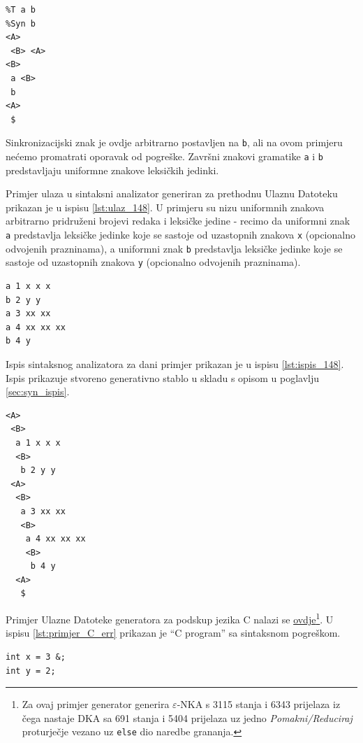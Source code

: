 \documentclass[times, 12pt, utf8]{book}
\begin{document}
\begin{lstlisting}[caption={Ulazna Datoteka za gramatiku sa 148.~stranice udžbenika.},label=lst:ulazna_datoteka_148]
%V <A> <B>
%T a b
%Syn b
<A>
 <B> <A>
<B>
 a <B>
 b
<A>
 $
\end{lstlisting}

Sinkronizacijski znak je ovdje arbitrarno postavljen na \verb|b|, ali na ovom primjeru nećemo promatrati oporavak od pogreške.
Završni znakovi gramatike \verb|a| i \verb|b| predstavljaju uniformne znakove leksičkih jedinki.

Primjer ulaza u sintaksni analizator generiran za prethodnu Ulaznu Datoteku prikazan je u ispisu \ref{lst:ulaz_148}.
U primjeru su nizu uniformnih znakova arbitrarno pridruženi brojevi redaka i leksičke jedine - recimo da uniformni znak \verb|a| predstavlja leksičke jedinke koje se sastoje od uzastopnih znakova \verb|x| (opcionalno odvojenih prazninama), a uniformni znak \verb|b| predstavlja leksičke jedinke koje se sastoje od uzastopnih znakova \verb|y| (opcionalno odvojenih prazninama).

\begin{lstlisting}[caption={Ulaz u analizator za gramatiku sa 148.~stranice udžbenika.},label=lst:ulaz_148]
a 1 x x x
b 2 y y
a 3 xx xx
a 4 xx xx xx
b 4 y
\end{lstlisting}

Ispis sintaksnog analizatora za dani primjer prikazan je u ispisu \ref{lst:ispis_148}.
Ispis prikazuje stvoreno generativno stablo u skladu s opisom u poglavlju \ref{sec:syn_ispis}.

\begin{lstlisting}[caption={Ispis analizatora za gramatiku sa 148.~stranice udžbenika i ulaz is ispisa \ref{lst:ulaz_148}.},label=lst:ispis_148]
<A>
 <B>
  a 1 x x x
  <B>
   b 2 y y
 <A>
  <B>
   a 3 xx xx
   <B>
    a 4 xx xx xx
    <B>
     b 4 y
  <A>
   $
\end{lstlisting}

Primjer Ulazne Datoteke generatora za podskup jezika C nalazi se \href{https://github.com/fer-ppj/ppj-labosi/raw/master/res/lab2/simplePpjLang.san}{ovdje}\footnote{Za ovaj primjer generator generira \(\varepsilon\)-NKA s 3115 stanja i 6343 prijelaza iz čega nastaje DKA sa 691 stanja i 5404 prijelaza uz jedno \emph{Pomakni/Reduciraj} proturječje vezano uz \texttt{else} dio naredbe grananja.}.
U ispisu \ref{lst:primjer_C_err} prikazan je ``C program'' sa sintaksnom pogreškom.

\begin{lstlisting}[caption={Jednostavan C program sa sintaksnom greškom.},label=lst:primjer_C_err]
int x = 3 &;
int y = 2;
\end{lstlisting}
\end{document}
